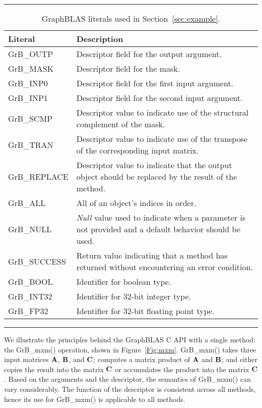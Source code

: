 \begin{table}[h]
\hrule
\begin{center}
\caption{GraphBLAS literals used in Section~\ref{sec:example}.}
\label{Tab:GrBliterals}
\begin{tabular}{lp{5.9cm}}
Literal                 & Description  \\
\hline
	{\sf GrB\_OUTP}      & Descriptor field for the output argument. \\
	{\sf GrB\_MASK}      & Descriptor field for the mask. \\
	{\sf GrB\_INP0}      & Descriptor field for the first input argument. \\
	{\sf GrB\_INP1}      & Descriptor field for the second input argument. \\ 
	{\sf GrB\_SCMP}      & Descriptor value to indicate use of the structural complement of the mask. \\
	{\sf GrB\_TRAN}      & Descriptor value to indicate use of the transpose of the corresponding input matrix. \\
	{\sf GrB\_REPLACE}   & Descriptor value to indicate that the output object should be replaced by the result of the method. \\ 
	{\sf GrB\_ALL}       & All of an object's indices in order. \\
	{\sf GrB\_NULL}      & \emph{Null} value used to indicate when a parameter is not provided and a default behavior should be used. \\
	{\sf GrB\_SUCCESS}   & Return value indicating that a method has returned without encountering an error condition. \\
	{\sf GrB\_BOOL}		   & Identifier for boolean type. \\
	{\sf GrB\_INT32}	   & Identifier for 32-bit integer type. \\
	{\sf GrB\_FP32}		   & Identifier for 32-bit floating point type. \\
\end{tabular}
\end{center}
\hrule
\end{table}

We illustrate the principles behind the GraphBLAS C API with a single method: 
the {\sf GrB\_mxm()} operation, shown in Figure~\ref{Fig:mxm}.
{\sf GrB\_mxm()} takes three input matrices ${\bf A}$, ${\bf B}$, and ${\bf C}$; 
computes a matrix product of ${\bf A}$ and ${\bf B}$; and either copies the result into the matrix ${\bf C}$
or accumulates the product into the matrix ${\bf C}$.  Based on the arguments 
and the descriptor, the semantics of {\sf GrB\_mxm()} can vary considerably.
The function of the descriptor is consistent across all methods, hence its use for
{\sf GrB\_mxm()} is applicable to all methods.

